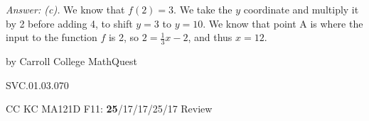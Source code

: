 {\it Answer: (c).} We know that $f(2)=3$.  
We take the $y$ coordinate and multiply it by 2 before adding 4, to shift $y=3$ to $y=10$.
We know that point A is where the input to the function $f$ is 2, so $2 = \frac{1}{3} x - 2$, and thus $x = 12$.


\medskip
by Carroll College MathQuest

SVC.01.03.070


CC KC MA121D F11: {\bf 25}/17/17/25/17 Review \\
